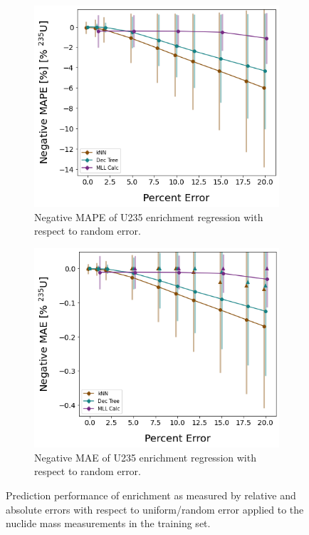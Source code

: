 \begin{figure}[!htb]
  \centering
  \begin{subfigure}[b]{0.49\textwidth}
    \centering
    \includegraphics[width=\textwidth]{./chapters/exp1/randerr_compare_nuc29_MAPE_enri.png}
    \caption{Negative \gls{MAPE} of \gls{U235} enrichment regression with 
             respect to random error.}
    \label{fig:enrimape}
  \end{subfigure}
  \hfill
  \begin{subfigure}[b]{0.49\textwidth}
    \centering
    \includegraphics[width=\textwidth]{./chapters/exp1/randerr_compare_nuc29_MAE_enri.png}
    \caption{Negative \gls{MAE} of \gls{U235} enrichment regression with 
             respect to random error.}
    \label{fig:enrimae}
  \end{subfigure}
  \caption[Prediction performance of enrichment regression with increasing 
           training set error]
          {Prediction performance of enrichment as measured by relative and 
           absolute errors with respect to uniform/random error applied to the 
           nuclide mass measurements in the training set.}
  \label{fig:randenri}
\end{figure}  


